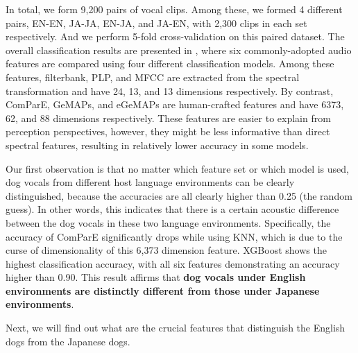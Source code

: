 In total, we form 9,200 pairs of vocal clips. Among these, we formed 4 different pairs, EN-EN, JA-JA, EN-JA, and JA-EN, with 2,300 clips in each set respectively.  
And we perform 5-fold cross-validation on this paired dataset. 
The overall classification results are presented in , 
where six commonly-adopted audio features are compared using four different classification models. Among these features, filterbank, PLP, and MFCC 
are extracted from the spectral transformation and have 24, 13, and 13 dimensions respectively. By contrast, ComParE, GeMAPs, and eGeMAPs are human-crafted features and have 6373, 62, and 88 dimensions respectively. 
These features are easier to explain from perception perspectives, 
however, they might be less informative than direct spectral features, 
resulting in relatively lower accuracy in some models. 


Our first observation is that no matter which feature set or which model is used, 
dog vocals from different host language environments can be clearly distinguished, 
because the accuracies are all clearly higher than 0.25 (the random guess).
In other words, this indicates that there is a certain acoustic difference 
between the dog vocals in these two language environments. 
Specifically, the accuracy of ComParE significantly drops while using KNN, 
which is due to the curse of dimensionality of this 6,373 dimension feature.
XGBoost shows the highest classification accuracy, 
with all six features demonstrating an accuracy higher than 0.90. This result affirms that
\textbf{dog vocals under English environments are distinctly different from 
those under Japanese environments}. %

Next, we will find out what are the crucial features 
that distinguish the English dogs from the Japanese dogs. 


